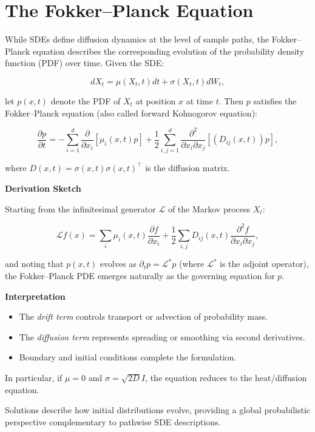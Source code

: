\section{The Fokker--Planck Equation}

While SDEs define diffusion dynamics at the level of sample paths, the Fokker--Planck equation describes the corresponding evolution of the probability density function (PDF) over time. Given the SDE:

\[
dX_t = \mu(X_t, t) dt + \sigma(X_t, t) dW_t,
\]

let \( p(x, t) \) denote the PDF of \( X_t \) at position \( x \) at time \( t \). Then \( p \) satisfies the Fokker--Planck equation (also called forward Kolmogorov equation):

\[
\frac{\partial p}{\partial t} = -\sum_{i=1}^d \frac{\partial}{\partial x_i} \left[\mu_i(x,t) p\right] + \frac{1}{2} \sum_{i,j=1}^d \frac{\partial^2}{\partial x_i \partial x_j} \left[(D_{ij}(x,t)) p\right],
\]

where \( D(x,t) = \sigma(x,t) \sigma(x,t)^\top \) is the diffusion matrix.

\textbf{Derivation Sketch}

Starting from the infinitesimal generator \( \mathcal{L} \) of the Markov process \( X_t \):

\[
\mathcal{L} f(x) = \sum_i \mu_i(x,t) \frac{\partial f}{\partial x_i} + \frac{1}{2} \sum_{i,j} D_{ij}(x,t) \frac{\partial^2 f}{\partial x_i \partial x_j},
\]

and noting that \( p(x,t) \) evolves as \( \partial_t p = \mathcal{L}^* p \) (where \( \mathcal{L}^* \) is the adjoint operator), the Fokker--Planck PDE emerges naturally as the governing equation for \( p \).

\textbf{Interpretation}

\begin{itemize}
    \item The \emph{drift term} controls transport or advection of probability mass.
    \item The \emph{diffusion term} represents spreading or smoothing via second derivatives.
    \item Boundary and initial conditions complete the formulation.
\end{itemize}

In particular, if \( \mu = 0 \) and \( \sigma = \sqrt{2D} I \), the equation reduces to the heat/diffusion equation.

Solutions describe how initial distributions evolve, providing a global probabilistic perspective complementary to pathwise SDE descriptions.

